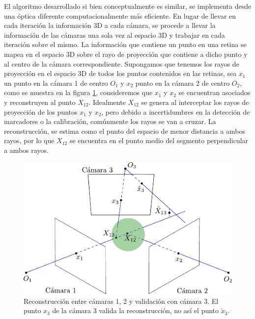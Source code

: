 El algoritmo desarrollado si bien conceptualmente es similar, se implementa desde una óptica diferente computacionalmente más eficiente.
En lugar de llevar en cada iteración la información 3D a cada cámara, se procede a llevar la información de las cámaras una sola vez al espacio 3D y trabajar en cada iteración sobre el mismo. La información que contiene un punto en una retina se mapea en el espacio 3D sobre el rayo de proyección que contiene a dicho punto y al centro de la cámara correspondiente. Supongamos que tenemos los rayos de proyección en el espacio 3D de todos los puntos contenidos en las retinas, sea $x_1$ un punto en la cámara 1 de centro $O_1$ y $x_2$ punto en la cámara 2 de centro $O_2$, como se muestra en la figura \ref{img_reconstruccion_validacion}, consideremos que $x_1$ y $x_2$ se encuentran asociados y reconstruyen al punto $X_{12}$. Idealmente $X_{12}$ se genera al interceptar los rayos de proyección de los puntos $x_1$ y $x_2$, pero debido a incertidumbres en la detección de marcadores o la calibración, comúnmente los rayos se van a cruzar. La reconstrucción, se estima como el punto del espacio de menor distancia a ambos rayos, por lo que
$X_{12}$ se encuentra en el punto medio del segmento perpendicular a ambos rayos.


\begin{figure}[h!]
\centering
\hspace{-1cm}
\captionsetup{justification=centering,margin=1.0cm}
\includegraphics[scale=0.65]{img/Reconstruccion/validacion.pdf}
\caption{Reconstrucción entre cámaras 1, 2 y validación con cámara 3. El punto $x_3$ de la cámara 3 valida la reconstrucción, no así el punto $\tilde{x}_3$.}
\label{img_reconstruccion_validacion}
\end{figure}

